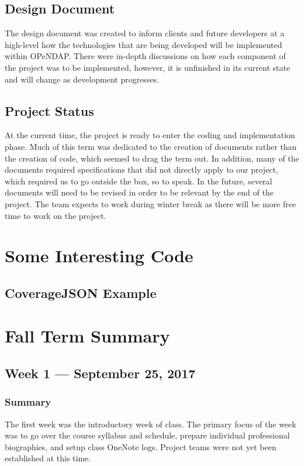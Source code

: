 \documentclass[onecolumn, draftclsnofoot,10pt, compsoc]{IEEEtran}
\begin{document}
\subsection{Design Document}
The design document was created to inform clients and future developers at a high-level how the technologies that are being developed will be implemented within OPeNDAP. There were in-depth discussions on how each component of the project was to be implemented, however, it is unfinished in its current state and will change as development progresses. 

\subsection{Project Status}
At the current time, the project is ready to enter the coding and implementation phase. Much of this term was dedicated to the creation of documents rather than the creation of code, which seemed to drag the term out. In addition, many of the documents required specifications that did not directly apply to our project, which required us to go outside the box, so to speak. In the future, several documents will need to be revised in order to be relevant by the end of the project. The team expects to work  during winter break as there will be more free time to work on the project.

\section{Some Interesting Code}

\subsection{CoverageJSON Example}
\begin{figure}[H]
    \centering
    
    \label{fig:covjson}
\end{figure}

\section{Fall Term Summary}
\subsection{Week 1 --- September 25, 2017}
\subsubsection{Summary}
The first week was the introductory week of class. The primary focus of the week was to go over the course syllabus and schedule, prepare individual professional biographies, and setup class OneNote logs. Project teams were not yet been established at this time.
\end{document}
